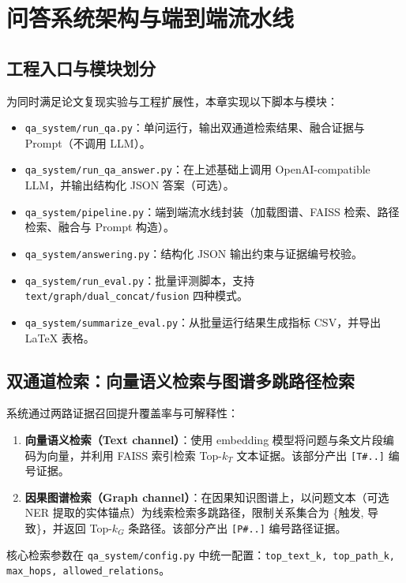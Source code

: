 \section{问答系统架构与端到端流水线}
\label{sec:qa_arch}

\subsection{工程入口与模块划分}
\label{subsec:entrypoints}

为同时满足论文复现实验与工程扩展性，本章实现以下脚本与模块：
\begin{itemize}
  \item \texttt{qa\_system/run\_qa.py}：单问运行，输出双通道检索结果、融合证据与 Prompt（不调用 LLM）。
  \item \texttt{qa\_system/run\_qa\_answer.py}：在上述基础上调用 OpenAI-compatible LLM，并输出结构化 JSON 答案（可选）。
  \item \texttt{qa\_system/pipeline.py}：端到端流水线封装（加载图谱、FAISS 检索、路径检索、融合与 Prompt 构造）。
  \item \texttt{qa\_system/answering.py}：结构化 JSON 输出约束与证据编号校验。
  \item \texttt{qa\_system/run\_eval.py}：批量评测脚本，支持 \texttt{text/graph/dual\_concat/fusion} 四种模式。
  \item \texttt{qa\_system/summarize\_eval.py}：从批量运行结果生成指标 CSV，并导出 LaTeX 表格。
\end{itemize}

\subsection{双通道检索：向量语义检索与图谱多跳路径检索}
\label{subsec:dual_retrieval}

系统通过两路证据召回提升覆盖率与可解释性：
\begin{enumerate}
  \item \textbf{向量语义检索（Text channel）}：使用 embedding 模型将问题与条文片段编码为向量，并利用 FAISS 索引检索 Top-$k_T$ 文本证据。该部分产出 \texttt{[T\#..]} 编号证据。
  \item \textbf{因果图谱检索（Graph channel）}：在因果知识图谱上，以问题文本（可选 NER 提取的实体锚点）为线索检索多跳路径，限制关系集合为 \{触发, 导致\}，并返回 Top-$k_G$ 条路径。该部分产出 \texttt{[P\#..]} 编号路径证据。
\end{enumerate}

核心检索参数在 \texttt{qa\_system/config.py} 中统一配置：\texttt{top\_text\_k, top\_path\_k, max\_hops, allowed\_relations}。

